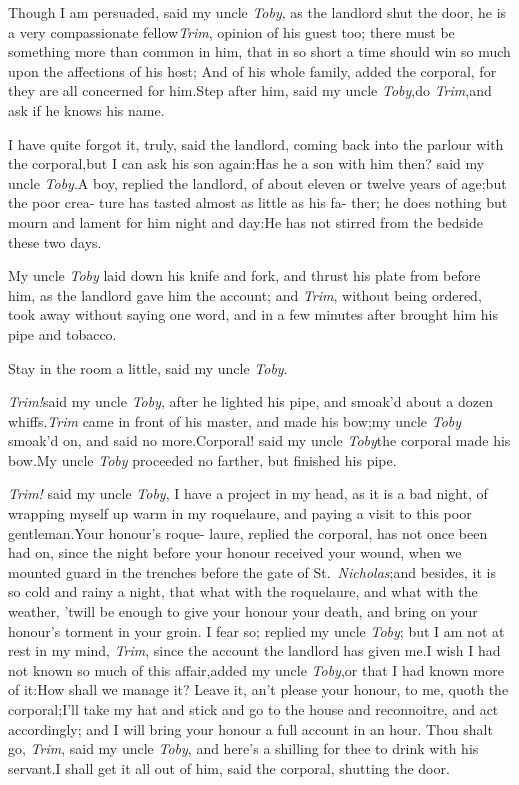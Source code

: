 \documentclass{article}
\begin{document}
Though I am persuaded, said my uncle \textit{Toby}, as the
landlord shut the door, he is a very compassionate
fellow\tsk \textit{Trim},\break
{}
opinion
of his guest too; there must be something more than common in him,
that in so short a time should win so much upon the affections of
his host;\break
\tsh And of his whole family, added the corporal,
for they are all concerned for him.\tsh Step after him,
said my uncle \textit{Toby},\tsk do \textit{Trim},\tsk and ask if
he knows his name.

\tsh I have quite forgot it, truly,\break
said the landlord, coming back into the\break
parlour with the corporal,\tsk but I can\break
ask his son again:\tsh Has he a son with\break
him then? said my uncle \textit{Toby}.\tsk A boy,\break
replied the landlord, of about eleven or\break
twelve years of age;\tsk but the poor crea-\break
ture has tasted almost as little as his fa-\break
ther; he does nothing but mourn and\break
lament for him night and day:\tsh He\break
has not stirred from the bedside these\break
two days.

My uncle \textit{Toby} laid down his knife and fork, and thrust
his plate from before him, as the landlord gave him the account;
and \textit{Trim}, without being ordered, took away without
saying one word, and in a few minutes after brought him his
pipe and tobacco.

\tsh Stay in the room a little, said my uncle
\textit{Toby}.\tsh

\textit{Trim!}\tsh said my uncle \textit{Toby}, after
he lighted his pipe, and smoak’d about a dozen
whiffs.\tsh \textit{Trim} came in front of his master, and
made his bow;\tsk my uncle \textit{Toby} smoak’d on, and said
no more.\tsh Corporal! said my uncle \textit{Toby}\break\tsh the
corporal made his bow.\tsh\break My uncle \textit{Toby} proceeded
no farther, but finished his pipe.

\textit{Trim!} said my uncle \textit{Toby}, I have a project
in my head, as it is a bad night,\break
of wrapping myself up warm in my
ro\-quelaure, and paying a visit to this poor
gentleman.\tsh Your honour’s roque- laure, replied the
corporal, has not once been had on, since the night before your
honour received your wound, when we mounted guard in the trenches
before the gate of St.~\textit{Nicholas};\tsk and besides, it is so
cold and rainy a night, that what with the roquelaure, and what with the
weather, ’twill be enough to give your honour your death, and
bring on your honour’s torment in your groin. I fear so;
replied my uncle \textit{Toby}; but I am not at rest in my mind,
\textit{Trim}, since the account the landlord has given
me.\tsh I wish I had not known so much of this
affair,\tsk added my uncle \textit{Toby},\tsk or that I had known
more of it:\tsh How shall we manage it? Leave it,
an’t please your honour, to me, quoth the
corporal;\tsh I’ll take my hat and stick and go to
the house and reconnoitre, and act accordingly; and I will bring
your
honour a full account in an hour.\tsh\break
Thou shalt go, \textit{Trim}, said my uncle \textit{Toby}, and
here’s a shilling for thee to drink with his servant.\tsh I
shall get it all out of him, said the corporal, shutting the
door.
\end{document}
